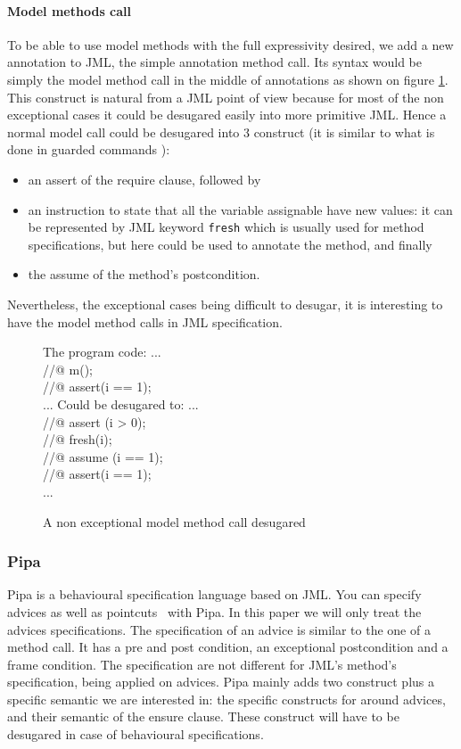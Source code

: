 \paragraph{Model methods call}
To be able to use model methods with the full expressivity desired, we
add a new annotation to JML, the simple annotation method call. Its
syntax would be simply the model method call in the middle of
annotations as shown on figure \ref{model_meth}. This construct is
natural from a JML point of view because for most of the non
exceptional cases it could be desugared easily into more primitive
JML. Hence a normal model call could be desugared into 3 construct (it
is similar to what is done in guarded commands \cite{BarnettL05}):
\begin{itemize} 
\item 
an assert of the require clause, followed by
\item 
an instruction to state that all the variable assignable have new
values: it can be represented by JML keyword {\tt fresh} which is
usually used for method specifications, but here could be used to
annotate the method, and finally
\item the assume of the method's postcondition.
\end{itemize}
Nevertheless, the exceptional cases being difficult to desugar, it is
interesting to have the model method calls in JML specification.

\begin{figure}
\begin{center}\begin{minipage}{4cm}
The program code:
\bcode
...\\
//@ m();\\
//@ assert(i == 1);\\
...
\ecode
Could be desugared to:
\bcode
...\\
//@ assert (i > 0);\\
//@ fresh(i);\\
//@ assume (i == 1);\\
//@ assert(i == 1);\\
...
\ecode
\end{minipage}\end{center}
\caption{A non exceptional model method call desugared}
\label{model_meth}
\end{figure}
\subsubsection{Pipa}
Pipa is a behavioural specification language based on JML.  You can
specify advices as well as pointcuts~\cite{pointcuts07} with Pipa.  In
this paper we will only treat the advices specifications.  The
specification of an advice is similar to the one of a method call. It
has a pre and post condition, an exceptional postcondition and a frame
condition. The specification are not different for JML's method's
specification, being applied on advices.  Pipa mainly adds two
construct plus a specific semantic we are interested in: the specific
constructs for around advices, and their semantic of the ensure
clause. These construct will have to be desugared in case of
behavioural specifications.



